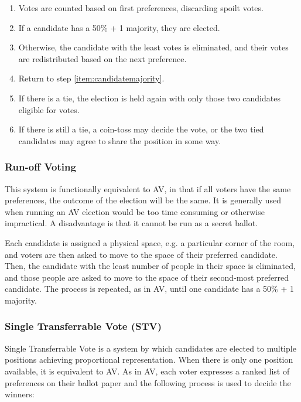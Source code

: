 \documentclass[a4paper, 11pt]{article} %
\begin{document}
\begin{enumerate}
\item Votes are counted based on first preferences, discarding spoilt votes.
\item \label{item:candidatemajority} If a candidate has a 50\% + 1 majority, they are elected.
\item Otherwise, the candidate with the least votes is eliminated, and their votes are redistributed based on the next preference.
\item Return to step \ref{item:candidatemajority}.
\item If there is a tie, the election is held again with only those two candidates eligible for votes.
\item If there is still a tie, a coin-toss may decide the vote, or the two tied candidates may agree to share the position in some way.
\end{enumerate}

\subsubsection{Run-off Voting}
This system is functionally equivalent to AV, in that if all voters have the same preferences, the outcome of the election will be the same.  It is generally used when running an AV election would be too time consuming or otherwise impractical.  A disadvantage is that it cannot be run as a secret ballot.

Each candidate is assigned a physical space, e.g. a particular corner of the room, and voters are then asked to move to the space of their preferred candidate.  Then, the candidate with the least number of people in their space is eliminated, and those people are asked to move to the space of their second-most preferred candidate.  The process is repeated, as in AV, until one candidate has a 50\% + 1 majority.

\subsubsection{Single Transferrable Vote (STV)}
Single Transferrable Vote is a system by which candidates are elected to multiple positions achieving proportional representation.  When there is only one position available, it is equivalent to AV.  As in AV, each voter expresses a ranked list of preferences on their ballot paper and the following process is used to decide the winners:
\end{document}
